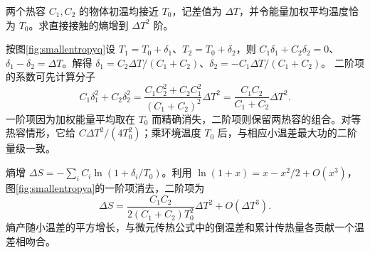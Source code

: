 \begin{exercise}[接触过程的熵产生随温差的展开]
两个热容 $C_1,C_2$ 的物体初温均接近 $T_0$，记差值为 $\Delta T$，并令能量加权平均温度恰为 $T_0$。求直接接触的熵增到 $\Delta T^2$ 阶。
\end{exercise}
\begin{solution}
按图\ref{fig:smallentropyq}设 $T_1=T_0+\delta_1$、$T_2=T_0+\delta_2$，则 $C_1\delta_1+C_2\delta_2=0$、$\delta_1-\delta_2=\Delta T$。解得 $\delta_1=C_2\Delta T/(C_1+C_2)$、$\delta_2=-C_1\Delta T/(C_1+C_2)$。
二阶项的系数可先计算分子
\[
 C_1\delta_1^2+C_2\delta_2^2
 =\frac{C_1C_2^2+C_2C_1^2}{(C_1+C_2)^2}\Delta T^2
 =\frac{C_1C_2}{C_1+C_2}\Delta T^2.
\]
一阶项因为加权能量平均取在 $T_0$ 而精确消失，二阶项则保留两热容的组合。对等热容情形，它给 $C\Delta T^2/(4T_0^2)$；乘环境温度 $T_0$ 后，与相应小温差最大功的二阶量级一致。

熵增 $\Delta S=-\sum_iC_i\ln(1+\delta_i/T_0)$。利用 $\ln(1+x)=x-x^2/2+O(x^3)$，图\ref{fig:smallentropya}的一阶项消去，二阶项为
\[
 \Delta S=\frac{C_1C_2}{2(C_1+C_2)T_0^2}\Delta T^2+O(\Delta T^3).
\]
熵产随小温差的平方增长，与微元传热公式中的倒温差和累计传热量各贡献一个温差相吻合。
\end{solution}

